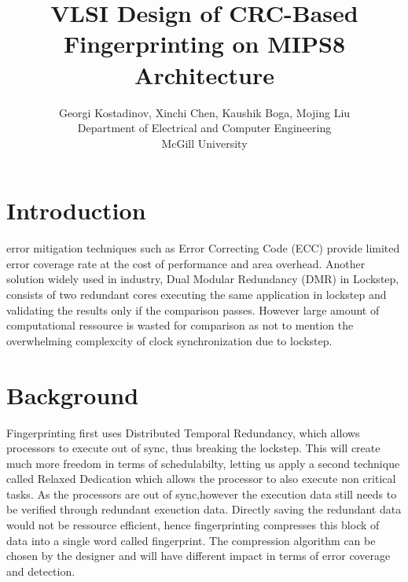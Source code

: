 \documentclass[10pt,journal,compsoc]{IEEEtran}
\begin{document}
\title{VLSI Design of CRC-Based Fingerprinting on MIPS8 Architecture}

\author{Georgi Kostadinov, Xinchi Chen, Kaushik Boga, Mojing Liu
\\Department of Electrical and Computer Engineering 
\\McGill University}



\maketitle

\section{Introduction}
 error mitigation techniques such as Error Correcting Code (ECC) provide limited
error coverage rate at the cost of performance and area overhead. Another solution widely
used in industry,  Dual Modular Redundancy (DMR) in Lockstep, consists of two
redundant cores executing the same application in lockstep and validating the results only if
the comparison passes. However large amount of computational ressource is wasted for comparison
as not to mention the overwhelming complexcity of clock synchronization due to lockstep.

\section{Background}
Fingerprinting first uses Distributed Temporal Redundancy, which allows processors to execute out of sync\cite{DTR}, thus breaking the lockstep. This will create much more freedom in terms of schedulabilty, letting us apply a second technique called Relaxed Dedication which allows the processor to also execute non critical tasks\cite{RD}. 
As the processors are out of sync,however the execution data still needs to be verified through redundant exeuction data. Directly saving the redundant data would not be ressource efficient, hence fingerprinting compresses this block of data into a single word called fingerprint. The compression algorithm can be chosen by the designer and will have different impact in terms of error coverage and detection. 
\end{document}
